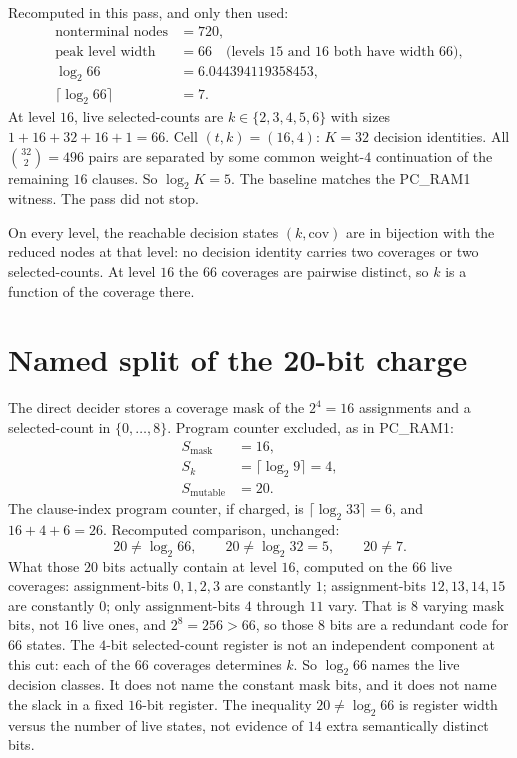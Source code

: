 \documentclass[11pt]{article}
\begin{document}
Recomputed in this pass, and only then used:
\begin{align*}
\text{nonterminal nodes}&=720,\\
\text{peak level width}&=66
\quad\text{(levels \(15\) and \(16\) both have width \(66\))},\\
\log_2 66&=6.044394119358453,\\
\lceil\log_2 66\rceil&=7.
\end{align*}
At level \(16\), live selected-counts are \(k\in\{2,3,4,5,6\}\) with sizes
\(1+16+32+16+1=66\).
Cell \((t,k)=(16,4)\): \(K=32\) decision identities.
All \(\binom{32}{2}=496\) pairs are separated by some common weight-\(4\) continuation of the remaining \(16\) clauses.
So \(\log_2 K=5\).
The baseline matches the PC\_RAM1 witness. The pass did not stop.

On every level, the reachable decision states \((k,\mathrm{cov})\) are in bijection with the reduced nodes at that level:
no decision identity carries two coverages or two selected-counts.
At level \(16\) the \(66\) coverages are pairwise distinct, so \(k\) is a function of the coverage there.

\section*{Named split of the 20-bit charge}
The direct decider stores a coverage mask of the \(2^4=16\) assignments and a selected-count in \(\{0,\ldots,8\}\).
Program counter excluded, as in PC\_RAM1:
\begin{align*}
S_{\mathrm{mask}}&=16,\\
S_k&=\lceil\log_2 9\rceil=4,\\
S_{\mathrm{mutable}}&=20.
\end{align*}
The clause-index program counter, if charged, is \(\lceil\log_2 33\rceil=6\), and \(16+4+6=26\).
Recomputed comparison, unchanged:
\[
20\neq\log_2 66,\qquad 20\neq\log_2 32=5,\qquad 20\neq 7.
\]
What those \(20\) bits actually contain at level \(16\), computed on the \(66\) live coverages:
assignment-bits \(0,1,2,3\) are constantly \(1\);
assignment-bits \(12,13,14,15\) are constantly \(0\);
only assignment-bits \(4\) through \(11\) vary.
That is \(8\) varying mask bits, not \(16\) live ones, and \(2^8=256>66\), so those \(8\) bits are a redundant code for \(66\) states.
The \(4\)-bit selected-count register is not an independent component at this cut: each of the \(66\) coverages determines \(k\).
So \(\log_2 66\) names the live decision classes.
It does not name the constant mask bits, and it does not name the slack in a fixed \(16\)-bit register.
The inequality \(20\neq\log_2 66\) is register width versus the number of live states, not evidence of \(14\) extra semantically distinct bits.
\end{document}
